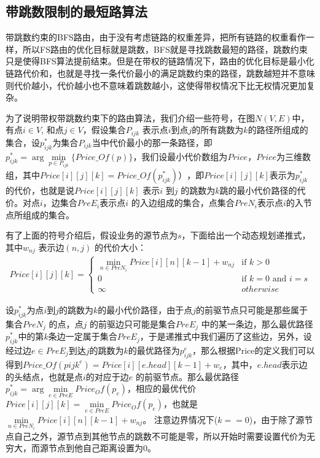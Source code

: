 \subsection{带跳数限制的最短路算法}
带跳数约束的BFS路由，由于没有考虑链路的权重差异，把所有链路的权重看作一样，所以FS路由的优化目标就是跳数，BFS就是寻找跳数最短的路径，跳数约束只是使得BFS算法提前结束。但是在带权的链路情况下，路由的优化目标是最小化链路代价和，也就是寻找一条代价最小的满足跳数约束的路径，跳数越短并不意味则代价越小，代价越小也不意味着跳数越小，这使得带权情况下比无权情况更加复杂。

为了说明带权带跳数约束下的路由算法，我们介绍一些符号，在图$N(V,E)$中，有点$i \in V$, 和点$j \in V$，假设集合$P_{ijk}$ 表示点$i$到点$j$的所有跳数为$k$的路径所组成的集合，设$p_{ijk}^*$为集合$P_{ijk}$当中代价最小的那一条路径，即$p_{ijk}^* =\arg\min\limits_{p \in P_{ijk}}\{Price\_Of(p)\}$，我们设最小代价数组为$Price$，$Price$为三维数组，其中$Price[i][j][k]=Price\_Of(p_{ijk}^*) ）$，即$Price[i][j][k]$表示为$p_{ijk}^*$ 的代价，也就是说$Price[i][j][k]$ 表示$i$ 到$j$ 的跳数为$k$跳的最小代价路径的代价。对点$i$，边集合$PreE_i$表示点$i$ 的入边组成的集合，点集合$PreN_i$表示点$i$的入节点所组成的集合。

有了上面的符号介绍后，假设业务的源节点为$s$，下面给出一个动态规划递推式，其中$w_{nj}$ 表示边$(n,j)$ 的代价大小：
\begin{equation}\label{dynamic}
\begin{split}
Price[i][j][k]
=\begin{cases}
\min\limits_{n \in PreN_i}{Price[i][n][k-1]+w_{nj}} & \text{if $k>0$}\\
0 & \text{if $k=0$ and $i=s $} \\
\infty &{otherwise}
\end{cases}
\end{split}
\end{equation}

设$p_{ijk}^*$为点$i$到$j$的跳数为$k$的最小代价路径，由于点$j$的前驱节点只可能是那些属于集合$PreN_j$ 的点，点$j$ 的前驱边只可能是集合$PreE_j$ 中的某一条边，那么最优路径$p_{ijk}^*$中的第$k$条边一定属于集合$PreE_j$，于是递推式中我们遍历了这些边，另外，设经过边$e \in PreE_j$到达$j$的跳数为$k$的最优路径为$p_{ijk}^e$，那么根据Price的定义我们可以得到$Price\_Of(p{ijk}^e)=Price[i][e.head][k-1]+w_e$，其中，$e.head$表示边的头结点，也就是点$i$的对应于边$e$ 的前驱节点。那么最优路径$p_{ijk}^*=\arg\min\limits_{e \in PreE}{Price_Of(p_e)}$，相应的最优代价$Price[i][j][k]=\min\limits_{e \in PreE}{Price_Of(p_e)}$，也就是$\min\limits_{n \in PreN_i}{Price[i][n][k-1]+w_{nj}}$。 注意边界情况下($k==0$)，由于除了源节点自己之外，源节点到其他节点的跳数不可能是零，所以开始时需要设置代价为无穷大，而源节点到他自己距离设置为0。

